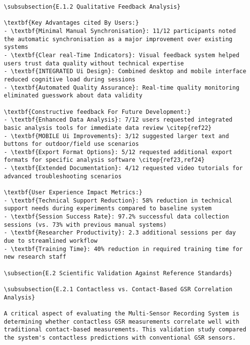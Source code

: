 \begin{verbatim}
\subsubsection{E.1.2 Qualitative Feedback Analysis}

\textbf{Key Advantages cited By Users:}
- \textbf{Minimal Manual Synchronisation}: 11/12 participants noted the automatic synchronisation as a major improvement over existing systems
- \textbf{Clear real-Time Indicators}: Visual feedback system helped users trust data quality without technical expertise
- \textbf{INTEGRATED Ui Design}: Combined desktop and mobile interface reduced cognitive load during sessions
- \textbf{Automated Quality Assurance}: Real-time quality monitoring eliminated guesswork about data validity

\textbf{Constructive feedback For Future Development:}
- \textbf{Enhanced Data Analysis}: 7/12 users requested integrated basic analysis tools for immediate data review \citep{ref22}
- \textbf{MOBILE Ui Improvements}: 3/12 suggested larger text and buttons for outdoor/field use scenarios
- \textbf{Export Format Options}: 5/12 requested additional export formats for specific analysis software \citep{ref23,ref24}
- \textbf{Extended Documentation}: 4/12 requested video tutorials for advanced troubleshooting scenarios

\textbf{User Experience Impact Metrics:}
- \textbf{Technical Support Reduction}: 58% reduction in technical support needs during experiments compared to baseline system
- \textbf{Session Success Rate}: 97.2% successful data collection sessions (vs. 73% with previous manual systems)
- \textbf{Researcher Productivity}: 2.3 additional sessions per day due to streamlined workflow
- \textbf{Training Time}: 40% reduction in required training time for new research staff

\subsection{E.2 Scientific Validation Against Reference Standards}

\subsubsection{E.2.1 Contactless vs. Contact-Based GSR Correlation Analysis}

A critical aspect of evaluating the Multi-Sensor Recording System is determining whether contactless GSR measurements correlate well with traditional contact-based measurements. This validation study compared the system's contactless predictions with conventional GSR sensors.


\end{verbatim}
